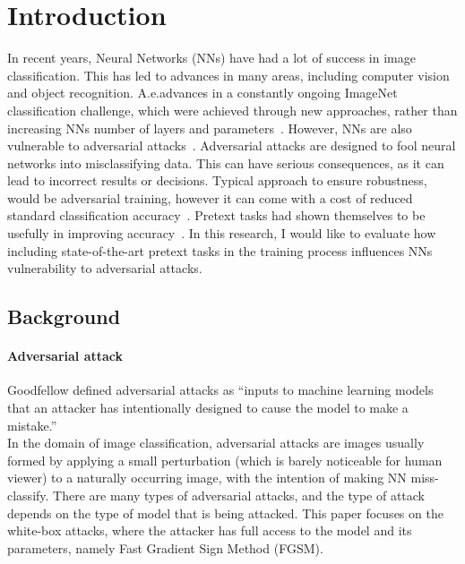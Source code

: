 \section{Introduction}

In recent years, Neural Networks (NNs) have had a lot of success in image classification.
This has led to advances in many areas, including computer vision and object recognition.
A.e.advances in a constantly ongoing ImageNet classification challenge, which were achieved
through new approaches,
rather than increasing NNs number of layers and parameters~\cite{russakovsky2015imagenet,DBLP:journals/corr/abs-1905-11946}.
However, NNs are also vulnerable to adversarial attacks~\cite{ilyas2019adversarial}.
Adversarial attacks are designed to fool neural networks into misclassifying data.
This can have serious consequences, as it can lead to incorrect results or decisions.
Typical approach to ensure robustness, would be adversarial training, however it can come with a cost of
reduced standard classification accuracy~\cite{https://doi.org/10.48550/arxiv.1805.12152}.
Pretext tasks had shown themselves to be usefully in improving accuracy~\cite{kolesnikov2019revisiting}.
In this research, I would like to evaluate how including state-of-the-art pretext tasks in the training process
influences NNs vulnerability to adversarial attacks.

\subsection{Background}

\paragraph{Adversarial attack}
Goodfellow defined adversarial attacks as “inputs to machine learning models that an
attacker has intentionally designed to cause the model to make a mistake.”
~\cite{DBLP:journals/corr/abs-1802-08195} \\
In the domain of image classification, adversarial attacks are images usually formed by applying a small perturbation
(which is barely noticeable for human viewer) to a naturally occurring image, with the intention of making NN miss-classify.
There are many types of adversarial attacks,
and the type of attack depends on the type of model that is being attacked.
This paper focuses on the white-box attacks, where the attacker has full access to the model and its parameters,
namely Fast Gradient Sign Method (FGSM).


